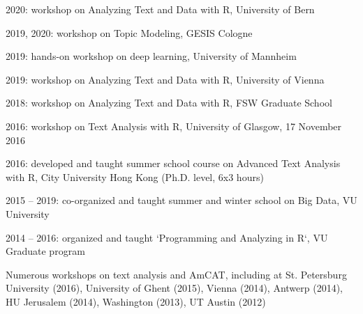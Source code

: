 \documentclass[a4paper,11pt]{article}
\begin{document}
{ {
\item 2020: workshop on Analyzing Text and Data with R, University of Bern
\item 2019, 2020: workshop on Topic Modeling, GESIS Cologne
\item 2019: hands-on workshop on deep learning, University of Mannheim 
\item 2019: workshop on Analyzing Text and Data with R, University of Vienna
\item 2018: workshop on Analyzing Text and Data with R, FSW Graduate School
\item 2016: workshop on Text Analysis with R, University of Glasgow, 17 November 2016
\item 2016: developed and taught summer school course on Advanced Text Analysis with R, City University Hong Kong (Ph.D. level, 6x3 hours)
\item 2015 -- 2019: co-organized and taught summer and winter school on Big Data, VU University
\item 2014 -- 2016: organized and taught `Programming and Analyzing in R`, VU Graduate program 
\item Numerous workshops on text analysis and AmCAT, including at St. Petersburg University (2016), University of Ghent
(2015), Vienna (2014), Antwerp (2014), HU Jerusalem (2014), Washington (2013),
UT Austin (2012)
}

}
\end{document}
